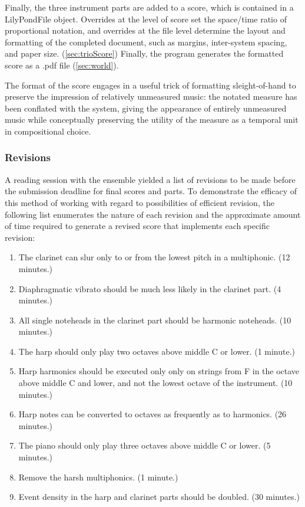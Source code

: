 Finally, the three instrument parts are added to a score, which is contained in a LilyPondFile object. Overrides at the level of score set the space/time ratio of proportional notation, and overrides at the file level determine the layout and formatting of the completed document, such as margins, inter-system spacing, and paper size. (\ref{sec:trioScore}) Finally, the program generates the formatted score as a .pdf file (\ref{sec:world}). 

The format of the score engages in a useful trick of formatting sleight-of-hand to preserve the impression of relatively unmeasured music: the notated measure has been conflated with the system, giving the appearance of entirely unmeasured music while conceptually preserving the utility of the measure as a temporal unit in compositional choice. 
 
\subsubsection{Revisions}
A reading session with the ensemble yielded a list of revisions to be made before the submission deadline for final scores and parts. To demonstrate the efficacy of this method of working with regard to possibilities of efficient revision, the following list enumerates the nature of each revision and the approximate amount of time required to generate a revised score that implements each specific revision:

\begin{enumerate}
\item The clarinet can slur only to or from the lowest pitch in a multiphonic. (12 minutes.)
\item Diaphragmatic vibrato should be much less likely in the clarinet part. (4 minutes.)
\item All single noteheads in the clarinet part should be harmonic noteheads. (10 minutes.)
\item The harp should only play two octaves above middle C or lower.  (1 minute.)
\item Harp harmonics should be executed only only on strings from F in the octave above middle C and lower, and not the lowest octave of the instrument. (10 minutes.)
\item Harp notes can be converted to octaves as frequently as to harmonics. (26 minutes.)
\item The piano should only play three octaves above middle C or lower. (5 minutes.)
\item Remove the harsh multiphonics. (1 minute.)
\item Event density in the harp and clarinet parts should be doubled. (30 minutes.)
\end{enumerate}


